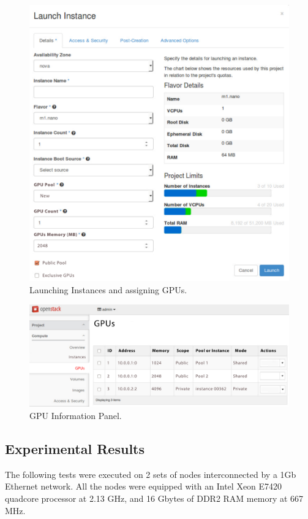 \documentclass[a4paper,twoside]{article}
\begin{document}
\begin{figure}[htb]
  \centering
  \includegraphics[width=\linewidth]{images/UI-launch.pdf}
  \caption{Launching Instances and assigning GPUs.}
  \label{fig:ui-launch}
\end{figure}
  
\begin{figure}[htb]
  \centering
  \includegraphics[width=\linewidth]{images/UI-rgpus.pdf}
  \caption{GPU Information Panel.}
  \label{fig:ui-rgpus}
\end{figure}

\subsection{Experimental Results}
The following tests were executed on 2 sets of nodes interconnected by a 1Gb Ethernet network.
All the nodes were equipped with an Intel Xeon E7420 quadcore processor at 2.13 GHz, and 16 Gbytes of DDR2 RAM memory at 667 MHz.
\end{document}
